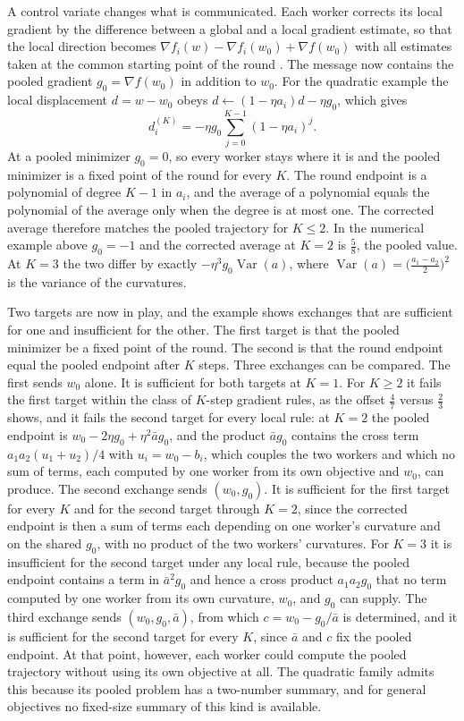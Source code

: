 \documentclass[11pt]{article}
\theoremstyle{definition}
\theoremstyle{plain}
\theoremstyle{remark}
\begin{document}
A control variate changes what is communicated. Each worker corrects its local gradient by the difference between a global and a local gradient estimate, so that the local direction becomes $\nabla f_i(w)-\nabla f_i(w_0)+\nabla f(w_0)$ with all estimates taken at the common starting point of the round \cite{karimireddy2020}. The message now contains the pooled gradient $g_0=\nabla f(w_0)$ in addition to $w_0$. For the quadratic example the local displacement $d=w-w_0$ obeys $d\leftarrow(1-\eta a_i)d-\eta g_0$, which gives
\[
d_i^{(K)}=-\eta g_0\sum_{j=0}^{K-1}(1-\eta a_i)^{j}.
\]
At a pooled minimizer $g_0=0$, so every worker stays where it is and the pooled minimizer is a fixed point of the round for every $K$. The round endpoint is a polynomial of degree $K-1$ in $a_i$, and the average of a polynomial equals the polynomial of the average only when the degree is at most one. The corrected average therefore matches the pooled trajectory for $K\le 2$. In the numerical example above $g_0=-1$ and the corrected average at $K=2$ is $\tfrac58$, the pooled value. At $K=3$ the two differ by exactly $-\eta^{3}g_0\operatorname{Var}(a)$, where $\operatorname{Var}(a)=\bigl(\tfrac{a_1-a_2}{2}\bigr)^2$ is the variance of the curvatures.

Two targets are now in play, and the example shows exchanges that are sufficient for one and insufficient for the other. The first target is that the pooled minimizer be a fixed point of the round. The second is that the round endpoint equal the pooled endpoint after $K$ steps. Three exchanges can be compared. The first sends $w_0$ alone. It is sufficient for both targets at $K=1$. For $K\ge 2$ it fails the first target within the class of $K$-step gradient rules, as the offset $\tfrac47$ versus $\tfrac23$ shows, and it fails the second target for every local rule: at $K=2$ the pooled endpoint is $w_0-2\eta g_0+\eta^{2}\bar a g_0$, and the product $\bar a g_0$ contains the cross term $a_1a_2(u_1+u_2)/4$ with $u_i=w_0-b_i$, which couples the two workers and which no sum of terms, each computed by one worker from its own objective and $w_0$, can produce. The second exchange sends $(w_0,g_0)$. It is sufficient for the first target for every $K$ and for the second target through $K=2$, since the corrected endpoint is then a sum of terms each depending on one worker's curvature and on the shared $g_0$, with no product of the two workers' curvatures. For $K=3$ it is insufficient for the second target under any local rule, because the pooled endpoint contains a term in $\bar a^{2}g_0$ and hence a cross product $a_1a_2g_0$ that no term computed by one worker from its own curvature, $w_0$, and $g_0$ can supply. The third exchange sends $(w_0,g_0,\bar a)$, from which $c=w_0-g_0/\bar a$ is determined, and it is sufficient for the second target for every $K$, since $\bar a$ and $c$ fix the pooled endpoint. At that point, however, each worker could compute the pooled trajectory without using its own objective at all. The quadratic family admits this because its pooled problem has a two-number summary, and for general objectives no fixed-size summary of this kind is available.
\end{document}
